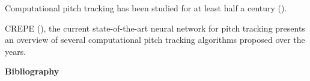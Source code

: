 \documentclass[letter,11pt]{report}
\begin{document}
\vfill
\clearpage

Computational pitch tracking has been studied for at least half a century (\cite{nollcepstrum}).

CREPE (\cite{crepe}), the current state-of-the-art neural network for pitch tracking presents an overview of several computational pitch tracking algorithms proposed over the years. 

\vfill
\clearpage

\noindent\LARGE{\textbf{Bibliography}}\\

\vspace{-0.5em}

\printbibliography[heading=none]
\end{document}
